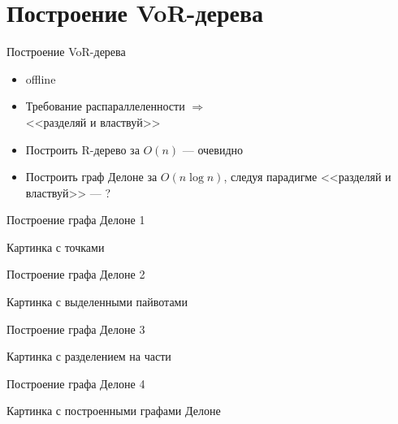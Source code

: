 \documentclass[14pt, fleqn, xcolor={dvipsnames, table}]{beamer}
\begin{document}
    \section{Построение VoR-дерева}    
    
        \begin{frame}{Построение VoR-дерева}
            \begin{itemize}
                \item offline
                \item Требование распараллеленности $\Longrightarrow$ \\ <<разделяй и властвуй>> 
                \item Построить R-дерево за $O(n)$ --- очевидно
                \item Построить граф Делоне за $O(n \log n)$, следуя парадигме <<разделяй и властвуй>> --- ?
            \end{itemize}
        \end{frame}
        
        \begin{frame}{Построение графа Делоне 1}
            \begin{center}
                Картинка с точками
            \end{center}             
        \end{frame}
        
        \begin{frame}{Построение графа Делоне 2}
            \begin{center}
                Картинка с выделенными пайвотами
            \end{center}              
        \end{frame}
       

        \begin{frame}{Построение графа Делоне 3}
            \begin{center}
                Картинка с разделением на части
            \end{center}             
        \end{frame}
        
        \begin{frame}{Построение графа Делоне 4}
            \begin{center}
                Картинка с построенными графами Делоне
            \end{center}            
        \end{frame}
        
\end{document}
